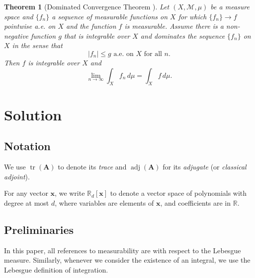 \documentclass{mpaper}
\newtheorem{theorem}{Theorem}[section]
\DeclareMathOperator{\adj}{adj}
\DeclareMathOperator{\tr}{tr}
\begin{document}
\begin{theorem}[Dominated Convergence Theorem
  \cite{royden2010real}] \label{thm:lebesgue}
  Let $(X, \mathcal{M}, \mu)$ be a measure space and $\{ f_n \}$ a sequence of
  measurable functions on $X$ for which $\{ f_n \} \to f$ pointwise a.e. on $X$
  and the function $f$ is measurable. Assume there is a non-negative function
  $g$ that is integrable over $X$ and dominates the sequence $\{ f_n \}$ on $X$
  in the sense that
  \[
    |f_n| \le g \text{ a.e. on $X$ for all $n$.}
  \]
  Then $f$ is integrable over $X$ and
  \[
    \lim_{n \to \infty} \int_X f_n\,d\mu = \int_X f\,d\mu.
  \]
\end{theorem}

\section{Solution}

\subsection{Notation}

We use $\tr(\mathbf{A})$ to denote its \emph{trace} and
$\adj(\mathbf{A})$ for its \emph{adjugate} (or \emph{classical adjoint}).

For any vector $\mathbf{x}$, we write $\mathbb{R}_d[\mathbf{x}]$ to denote a
vector space of polynomials with degree at most $d$, where variables are
elements of $\mathbf{x}$, and coefficients are in $\mathbb{R}$.

\subsection{Preliminaries}

In this paper, all references to measurability are with respect to the Lebesgue
measure. Similarly, whenever we consider the existence of an integral, we use
the Lebesgue definition of integration.
\end{document}
